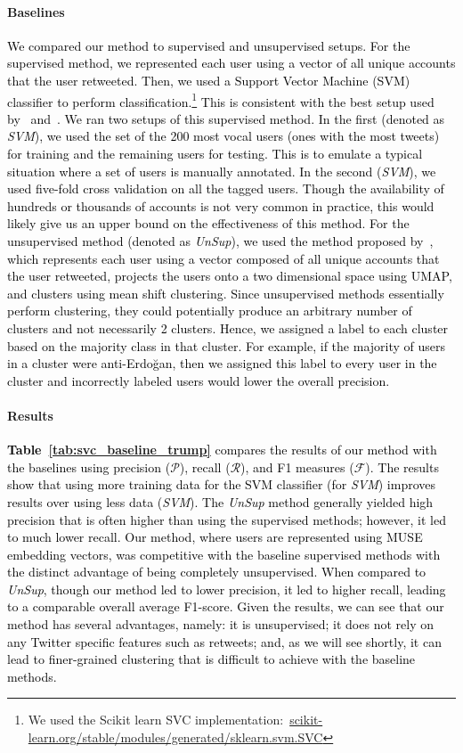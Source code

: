 \documentclass[letterpaper]{article} \usepackage{aaai20}  \usepackage{times}  \usepackage{stackengine}
\renewcommand{\prec}{\ensuremath{\mathcal{P}}\xspace}
\newcommand{\recall}{\ensuremath{\mathcal{R}}\xspace}
\newcommand{\fscore}{\ensuremath{\mathcal{F}}\xspace}
\newcommand{\kareem}{\textcolor{black}}
\begin{document}
\paragraph{Baselines}
\kareem{We compared our method to supervised and unsupervised setups.  For the supervised method, we represented each user using a vector of all unique accounts that the user retweeted. Then, we used a Support Vector Machine (SVM) classifier to perform classification.\footnote{We used the Scikit learn SVC implementation:~\url{scikit-learn.org/stable/modules/generated/sklearn.svm.SVC}} This is consistent with the best setup used by~\cite{magdy2016isisisnotislam} and~\cite{darwish2017predicting}.  We ran two setups of this supervised method. In the first (denoted as \textit{SVM}), we used the set of the 200 most vocal users (ones with the most tweets) for training and the remaining users for testing.  This is to emulate a typical situation where a set of users is manually annotated.  In the second (\textit{SVM}), we used five-fold cross validation on all the tagged users.  Though the availability of hundreds or thousands of accounts is not very common in practice, this would likely give us an upper bound on the effectiveness of this method.  
For the unsupervised method (denoted as \textit{UnSup}), we used the method proposed by~\cite{darwish2019unsupervisedStance}, which represents each user using a vector composed of all unique accounts that the user retweeted, projects the users onto a two dimensional space using UMAP, and clusters using mean shift clustering. Since unsupervised methods essentially perform clustering, they could potentially produce an arbitrary number of clusters and not necessarily 2 clusters. Hence, we assigned a label to each cluster based on the majority class in that cluster. For example, if the majority of users in a cluster were anti-Erdo\u{g}an, then we assigned this label to every user in the cluster and incorrectly labeled users would lower the overall precision.}
\vspace{-6pt}
\paragraph{Results}
\kareem{\textbf{Table~\ref{tab:svc_baseline_trump}} compares the results of our method with the baselines using precision (\prec), recall (\recall), and F1 measures (\fscore). The results show that using more training data for the SVM classifier (for \textit{SVM}) improves results over using less data (\textit{SVM}). The \textit{UnSup} method generally yielded high precision that is often higher than using the supervised methods; however, it led to much lower recall. Our method, where users are represented using MUSE embedding vectors, was competitive with the baseline supervised methods with the distinct advantage of being completely unsupervised.  When compared to \textit{UnSup}, though our method led to lower precision, it led to higher recall, leading to a comparable overall average F1-score. Given the results, we can see that our method has several advantages, namely: it is unsupervised; it does not rely on any Twitter specific features such as retweets; and, as we will see shortly, it can lead to finer-grained clustering that is difficult to achieve with the baseline methods.}
\end{document}
